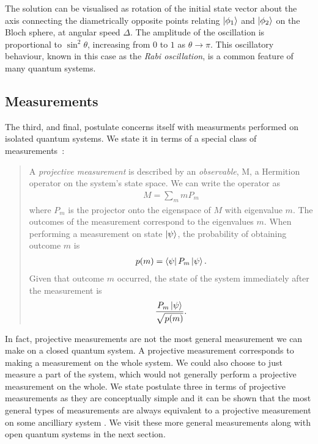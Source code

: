 The solution can be visualised as rotation of the initial state vector about the axis connecting the diametrically opposite points relating $\left\vert\phi_1\right\rangle$ and $\left\vert\phi_2\right\rangle$ on the Bloch sphere, at angular speed $\Delta$. The amplitude of the oscillation is proportional to $\sin^2\theta$, increasing from $0$ to $1$ as $\theta \rightarrow \pi$.  This oscillatory behaviour, known in this case as the \textit{Rabi oscillation}, is a common feature of many quantum systems.

\subsection{Measurements}

The third, and final, postulate concerns itself with measurments performed on isolated quantum systems. We state it in terms of a special class of measurements~\cite{nielsen+chuang}:
\begin{quotation}
  A \textit{projective measurement} is described by an \textit{observable}, M, a Hermition operator on the system's state space. We can write the operator as
  \begin{align}
    M = \sum_m mP_m
  \end{align}
  where $P_m$ is the projector onto the eigenspace of $M$ with eigenvalue $m$. The outcomes of the measurement correspond to the eigenvalues $m$. When performing a measurement on state $\left\vert\psi\right\rangle$, the probability of obtaining outcome $m$ is
  \begin{align}
    p(m) = \left\langle \psi\right\vert P_m\left\vert\psi\right\rangle.
  \end{align}
  Given that outcome $m$ occurred, the state of the system immediately after the measurement is
  \begin{align}
    \frac{P_m\left\vert\psi\right\rangle}{\sqrt{p(m)}}.
  \end{align}
\end{quotation}
In fact, projective measurements are not the most general measurement we can make on a closed quantum system. A projective measurement corresponds to making a measurement on the whole system. We could also choose to just measure a part of the system, which would not generally perform a projective measurement on the whole. We state postulate three in terms of projective measurements as they are conceptually simple and it can be shown that the most general types of measurements are always equivalent to a projective measurement on some ancilliary system \cite{peres}. We visit these more general measurements along with open quantum systems in the next section.



